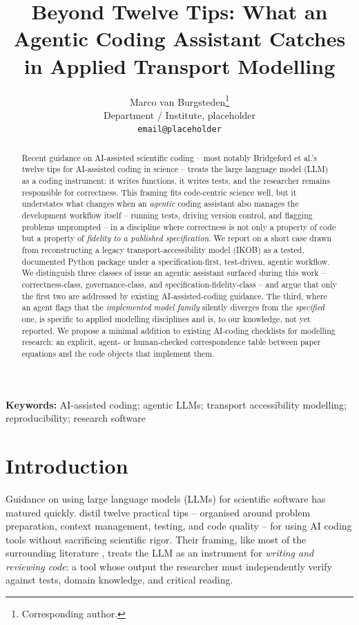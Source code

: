 \documentclass[11pt]{article}
\title{Beyond Twelve Tips: What an Agentic Coding Assistant Catches in Applied Transport Modelling}
\author{
  Marco van Burgsteden\thanks{Corresponding author.} \\
  \small Department / Institute, placeholder \\
  \small \texttt{email@placeholder}
}
\date{}
\begin{document}
\maketitle

\begin{abstract}
\noindent
Recent guidance on AI-assisted scientific coding -- most notably Bridgeford
et al.'s twelve tips for AI-assisted coding in science -- treats the
large language model (LLM) as a coding instrument: it writes functions,
it writes tests, and the researcher remains responsible for correctness.
This framing fits code-centric science well, but it understates what
changes when an \emph{agentic} coding assistant also manages the
development workflow itself -- running tests, driving version control,
and flagging problems unprompted -- in a discipline where correctness is
not only a property of code but a property of \emph{fidelity to a
published specification}. We report on a short case drawn from
reconstructing a legacy transport-accessibility model (IKOB) as a
tested, documented Python package under a specification-first,
test-driven, agentic workflow. We distinguish three classes of issue an
agentic assistant surfaced during this work -- correctness-class,
governance-class, and specification-fidelity-class -- and argue that
only the first two are addressed by existing AI-assisted-coding
guidance. The third, where an agent flags that the \emph{implemented
model family} silently diverges from the \emph{specified} one, is
specific to applied modelling disciplines and is, to our knowledge, not
yet reported. We propose a minimal addition to existing AI-coding
checklists for modelling research: an explicit, agent- or human-checked
correspondence table between paper equations and the code objects that
implement them.
\end{abstract}

\noindent\textbf{Keywords:} AI-assisted coding; agentic LLMs; transport accessibility modelling; reproducibility; research software

\section{Introduction}
\label{sec:intro}

Guidance on using large language models (LLMs) for scientific software
has matured quickly. \citet{bridgeford2026} distil twelve practical tips
-- organised around problem preparation, context management, testing,
and code quality -- for using AI coding tools without sacrificing
scientific rigor. Their framing, like most of the surrounding literature
\citep{sandve2013,wilson2014,poldrack2024}, treats the LLM as an
instrument for \emph{writing and reviewing code}: a tool whose output
the researcher must independently verify against tests, domain
knowledge, and critical reading.
\end{document}
